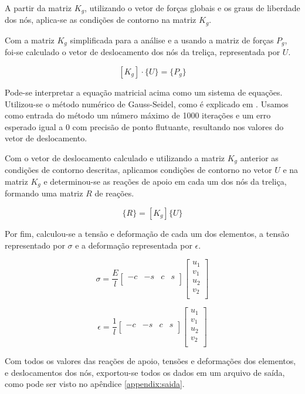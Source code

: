 \documentclass[paper=a4, fontsize=11pt]{scrartcl}
\begin{document}
A partir da matriz \(K_g\), utilizando o vetor de forças globais e os graus de liberdade dos nós, aplica-se as condições de contorno na matriz \(K_g\).

Com a matriz \(K_g\) simplificada para a análise e a usando a matriz de forças \(P_g\), foi-se calculado o vetor de deslocamento dos nós da treliça, representada por \(U\).

\[[K_g]\cdot\{U\} = \{P_g\}\]

Pode-se interpretar a equação matricial acima como um sistema de equações. Utilizou-se o método numérico de Gauss-Seidel, como é explicado em \cite{gauss_seidel}. Usamos como entrada do método um número máximo de 1000 iterações e um erro esperado igual a 0 com precisão de ponto flutuante, resultando nos valores do vetor de deslocamento.

Com o vetor de deslocamento calculado e utilizando a matriz \(K_g\) anterior as condições de contorno descritas, aplicamos condições de contorno no vetor \(U\) e na matriz \(K_g\) e determinou-se as reações de apoio em cada um dos nós da treliça, formando uma matriz \(R\) de reações.

\[\{R\} = [K_g] \{U\}\]

Por fim, calculou-se a tensão e deformação de cada um dos elementos, a tensão representado por \(\sigma\) e a deformação representada por \(\epsilon\).

\[\sigma = \frac{E}{l}  
\begin{bmatrix}
-c & -s & c & s\\
\end{bmatrix}
\begin{bmatrix}
u_1 \\
v_1 \\
u_2 \\
v_2 \\
\end{bmatrix}
\]


\[\epsilon = \frac{1}{l}  
\begin{bmatrix}
-c & -s & c & s\\
\end{bmatrix}
\begin{bmatrix}
u_1 \\
v_1 \\
u_2 \\
v_2 \\
\end{bmatrix}
\]

Com todos os valores das reações de apoio, tensões e deformações dos elementos, e deslocamentos dos nós, exportou-se todos os dados em um arquivo de saída, como pode ser visto no apêndice \ref{appendix:saida}.
\end{document}
